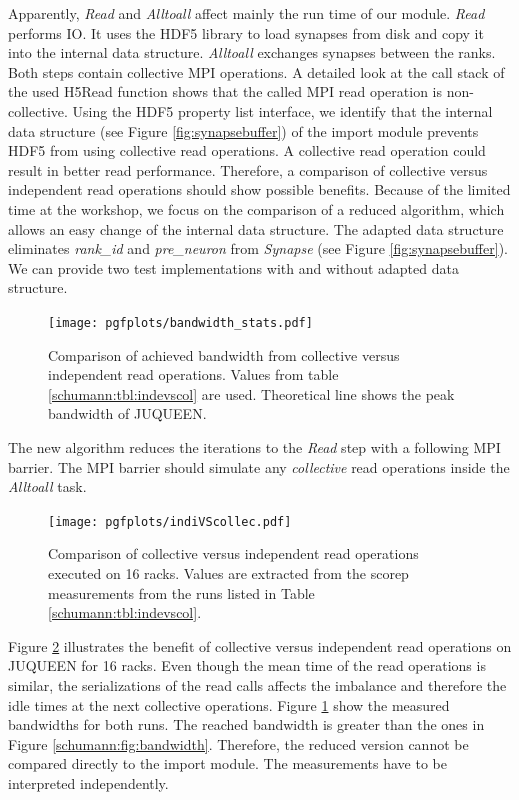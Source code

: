 Apparently, \emph{Read} and \emph{Alltoall} affect mainly the run time of our module.
\emph{Read} performs IO. It uses the HDF5 library to load synapses from disk and copy it into the internal data structure.
\emph{Alltoall} exchanges synapses between the ranks. Both steps contain collective MPI operations.
A detailed look at the call stack of the used H5Read function shows that the called MPI read operation is non-collective.
Using the HDF5 property list interface, we identify that the internal data structure (see Figure \ref{fig:synapsebuffer}) of the import module prevents HDF5 from using collective read operations.
A collective read operation could result in better read performance.
Therefore, a comparison of collective versus independent read operations should show possible benefits.
Because of the limited time at the workshop, we focus on the comparison of a reduced algorithm,
which allows an easy change of the internal data structure.
The adapted data structure eliminates \emph{rank\_id} and \emph{pre\_neuron} from \emph{Synapse} (see Figure \ref{fig:synapsebuffer}).
We can provide two test implementations with and without adapted data structure.
\begin{figure}[h!]
\begin{center}
 \texttt{[image: pgfplots/bandwidth\_stats.pdf]}
\end{center}
\caption[Comparison of achieved bandwidth from collective versus independent read operations]{Comparison of achieved bandwidth from collective versus independent read operations.
 Values from table \ref{schumann:tbl:indevscol} are used. Theoretical line shows the peak bandwidth of
 JUQUEEN.}
 \label{fig:indiVScollecBand}
\end{figure}
The new algorithm reduces the iterations to the \emph{Read} step with a following MPI barrier.
The MPI barrier should simulate any \emph{collective} read operations inside the \emph{Alltoall} task.
\begin{figure}[h!]
\begin{center}
 \texttt{[image: pgfplots/indiVScollec.pdf]}
\end{center}
\caption{Comparison of collective versus independent read operations executed on 16 racks.
 Values are extracted from the scorep measurements from the runs listed in Table \ref{schumann:tbl:indevscol}.}
 \label{schumann:fig:indiVScollec}
\end{figure}

\newpage
Figure \ref{schumann:fig:indiVScollec} illustrates the benefit of collective versus independent read operations
on JUQUEEN for 16 racks.
Even though the mean time of the read operations is similar, the serializations of the read calls affects the
imbalance and therefore the idle times at the next collective operations.
Figure \ref{fig:indiVScollecBand} show the measured bandwidths for both runs.
The reached bandwidth is greater than the ones in Figure \ref{schumann:fig:bandwidth}.
Therefore, the reduced version cannot be compared directly to the import module.
The measurements have to be interpreted independently.

